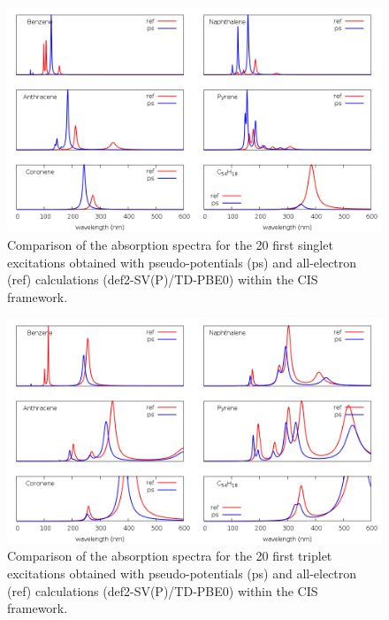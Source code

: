 \documentclass[aip]{revtex4-1}
\begin{document}
\begin{figure}
\begin{center}
\includegraphics[width=16cm]{grand_ciss}
\end{center}
\vspace{0.25in}
\hspace*{3in}
\caption{Comparison of the absorption spectra for the 20 first singlet excitations obtained with
pseudo-potentials (ps) and all-electron (ref) calculations (def2-SV(P)/TD-PBE0) within the CIS
framework.}
\label{fig:cnhn_uv_cist}
\end{figure}

\begin{figure}
\begin{center}
\includegraphics[width=16cm]{grand_cist}
\end{center}
\vspace{0.25in}
\hspace*{3in}
\caption{Comparison of the absorption spectra for the 20 first triplet excitations obtained with
pseudo-potentials (ps) and all-electron (ref) calculations (def2-SV(P)/TD-PBE0) within the CIS
framework.}
\label{fig:cnhn_uv_ciss}
\end{figure}
\end{document}
